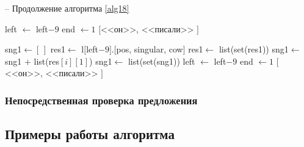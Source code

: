 \documentclass[main]{subfiles}
\begin{document}
\begin{algorithm}
	\caption{-- Продолжение алгоритма \ref{alg18}}\label{alg19}
	\begin{algorithmic}[1]
				\State left $\gets$ left$-9$
		\State end $\gets 1$
		\State \Return $[$<<он>>, <<писали>> $]$
		\EndIf
			\EndIf
			
			\State sng1$\gets [\,]$
			\State res1$\gets$ l$[$left$-9]$.$[$pos, singular, cow$]$
			\State res1$\gets$ list(set(res1))
			\State sng1$\gets$ sng1 $+$ list(res$[i][1]$)
			\EndIf
			\EndFor	
			\State sng1$\gets$ list(set(sng1))
			\State left $\gets$ left$-9$
			\State end $\gets 1$
			\State \Return $[$<<он>>, <<писали>> $]$
			\EndIf
			\EndIf
		\EndIf
		\EndWhile
		\EndIf
	\end{algorithmic}
\end{algorithm}
\subsubsection{Непосредственная проверка предложения}
\subsection{Примеры работы алгоритма}
\end{document}
